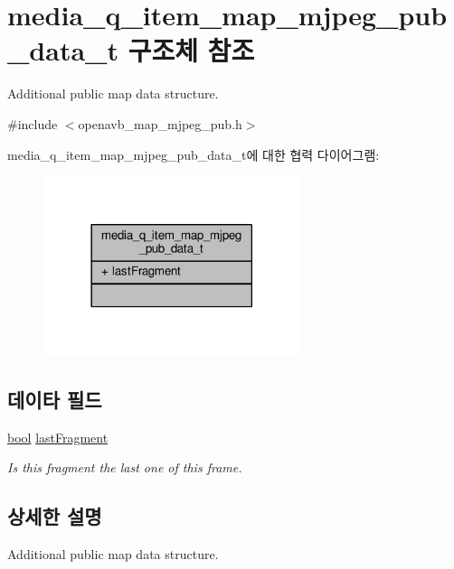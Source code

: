 \hypertarget{structmedia__q__item__map__mjpeg__pub__data__t}{}\section{media\+\_\+q\+\_\+item\+\_\+map\+\_\+mjpeg\+\_\+pub\+\_\+data\+\_\+t 구조체 참조}
\label{structmedia__q__item__map__mjpeg__pub__data__t}


Additional public map data structure.  




{\ttfamily \#include $<$openavb\+\_\+map\+\_\+mjpeg\+\_\+pub.\+h$>$}



media\+\_\+q\+\_\+item\+\_\+map\+\_\+mjpeg\+\_\+pub\+\_\+data\+\_\+t에 대한 협력 다이어그램\+:
\nopagebreak
\begin{figure}[H]
\begin{center}
\leavevmode
\includegraphics[width=213pt]{structmedia__q__item__map__mjpeg__pub__data__t__coll__graph}
\end{center}
\end{figure}
\subsection*{데이타 필드}
\begin{DoxyCompactItemize}
\item 
\hyperlink{avb__gptp_8h_af6a258d8f3ee5206d682d799316314b1}{bool} \hyperlink{structmedia__q__item__map__mjpeg__pub__data__t_a1db3399abba4fe879f482e7b6b144ace}{last\+Fragment}
\begin{DoxyCompactList}\small\item\em Is this fragment the last one of this frame. \end{DoxyCompactList}\end{DoxyCompactItemize}


\subsection{상세한 설명}
Additional public map data structure. 


